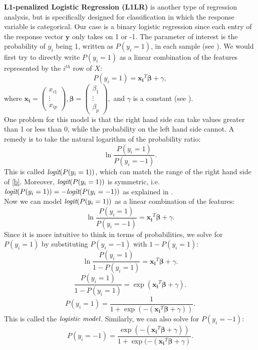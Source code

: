 \documentclass{article}
\begin{document}
\textbf{L1-penalized Logistic Regression (L1LR)} is another type of regression analysis, but is specifically designed for classification in which the response variable is categorical. Our case is a binary logistic regression since each entry of the response vector $\textbf{y}$ only takes on 1 or -1. The parameter of interest is the probability of $y_i$ being 1, written as $P(y_i=1)$, in each sample (see \cite{multivariate}). We would first try to directly write $P(y_i=1)$ as a linear combination of the features represented by the $i^{th}$ row of $X$:
\begin{equation}\label{b}
P(y_i=1)=\boldsymbol{x_i}^T\boldsymbol{\beta}+\gamma,
\end{equation}
where $ \boldsymbol{x_i}=\left(\begin{array}{c}x_{i1}\\ \vdots \\x_{ip}\end{array}\right), \boldsymbol{\beta}=\left(\begin{array}{c}\beta_1\\ \vdots \\ \beta_p\end{array}\right),$ and $\gamma$ is a constant (see \cite{multivariate}). \\
One problem for this model is that the right hand side can take values greater than 1 or less than 0, while the probability on the left hand side cannot. A remedy is to take the natural logarithm of the probability ratio:
$$\ln \frac{P(y_i=1)}{P(y_i=-1)}.$$ 
This is called $\emph{logit}(P(y_i=1))$, which can match the range of the right hand side of \eqref{b}. Moreover, $\emph{logit}(P(y_i=1))$ is symmetric, i.e. $\emph{logit}(P(y_i=1))=-\emph{logit}(P(y_i=-1))$ as explained in \cite{multivariate}.\\
Now we can model $\emph{logit}(P(y_i=1))$ as a linear combination of the features:
$$\ln \frac{P(y_i=1)}{P(y_i=-1)}=\boldsymbol{x_i}^T\boldsymbol{\beta}+\gamma.$$
Since it is more intuitive to think in terms of probabilities, we solve for $P(y_i=1)$ by substituting $P(y_i=-1)$ with $1-P(y_i=1)$:
$$\ln \frac{P(y_i=1)}{1-P(y_i=1)}=\boldsymbol{x_i}^T\boldsymbol{\beta}+\gamma.$$
$$\frac{P(y_i=1)}{1-P(y_i=1)}=\exp(\boldsymbol{x_i}^T\boldsymbol{\beta}+\gamma).$$
$$P(y_i=1)=\frac{1}{1+\exp(-(\boldsymbol{x_i}^T\boldsymbol{\beta}+\gamma))}.$$
This is called the $\emph{logistic model}$. Similarly, we can also solve for $P(y_i=-1)$:
$$P(y_i=-1)=\frac{\exp(-(\boldsymbol{x_i}^T\boldsymbol{\beta}+\gamma))}{1+\exp(-(\boldsymbol{x_i}^T\boldsymbol{\beta}+\gamma)}.$$
\end{document}
